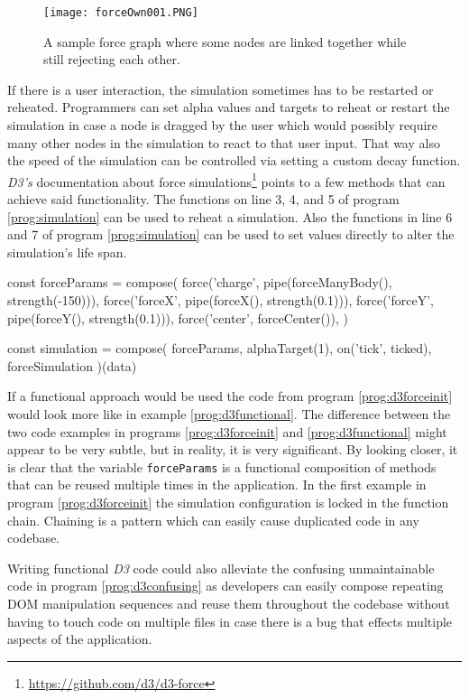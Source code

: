 \begin{figure}
  \centering
  \texttt{[image: forceOwn001.PNG]}
  \caption{A sample force graph where some nodes are linked together while still rejecting each other.}
  \label{fig:force005}
\end{figure}

If there is a user interaction, the simulation sometimes has to be restarted or reheated. Programmers can set alpha values and targets to reheat or restart the simulation in case a node is dragged by the user which would possibly require many other nodes in the simulation to react to that user input. That way also the speed of the simulation can be controlled via setting a custom decay function. \emph{D3's} documentation about force simulations\footnote{\url{https://github.com/d3/d3-force}} points to a few methods that can achieve said functionality. The functions on line 3, 4, and 5 of program \ref{prog:simulation} can be used to reheat a simulation. Also the functions in line 6 and 7 of program \ref{prog:simulation} can be used to set values directly to alter the simulation's life span.

\begin{program}
\caption{\emph{D3} written in a fictional functional way}
\label{prog:d3functional}
\begin{JsCode}
const forceParams = compose(
  force('charge', pipe(forceManyBody(), strength(-150))),
  force('forceX', pipe(forceX(), strength(0.1))),
  force('forceY', pipe(forceY(), strength(0.1))),
  force('center', forceCenter()),
)

const simulation = compose(
  forceParams,
  alphaTarget(1),
  on('tick', ticked),
  forceSimulation
)(data)
\end{JsCode}
\end{program}

If a functional approach would be used the code from program \ref{prog:d3forceinit} would look more like in example \ref{prog:d3functional}. The difference between the two code examples in programs \ref{prog:d3forceinit} and \ref{prog:d3functional} might appear to be very subtle, but in reality, it is very significant. By looking closer, it is clear that the variable \texttt{forceParams} is a functional composition of methods that can be reused multiple times in the application. In the first example in program \ref{prog:d3forceinit} the simulation configuration is locked in the function chain. Chaining is a pattern which can easily cause duplicated code in any codebase. 

Writing functional \emph{D3} code could also alleviate the confusing unmaintainable code in program \ref{prog:d3confusing} as developers can easily compose repeating DOM manipulation sequences and reuse them throughout the codebase without having to touch code on multiple files in case there is a bug that effects multiple aspects of the application.
